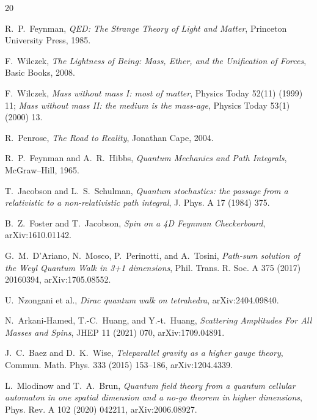 \documentclass[11pt]{article}
\begin{document}
\begin{thebibliography}{20}

R.~P.~Feynman,
\emph{QED: The Strange Theory of Light and Matter},
Princeton University Press, 1985.

F.~Wilczek,
\emph{The Lightness of Being: Mass, Ether, and the Unification of Forces},
Basic Books, 2008.

F.~Wilczek,
\emph{Mass without mass I: most of matter}, Physics Today 52(11) (1999) 11;
\emph{Mass without mass II: the medium is the mass-age},
Physics Today 53(1) (2000) 13.

R.~Penrose,
\emph{The Road to Reality}, Jonathan Cape, 2004.

R.~P.~Feynman and A.~R.~Hibbs,
\emph{Quantum Mechanics and Path Integrals}, McGraw--Hill, 1965.

T.~Jacobson and L.~S.~Schulman,
\emph{Quantum stochastics: the passage from a relativistic to a
non-relativistic path integral}, J. Phys. A 17 (1984) 375.

B.~Z.~Foster and T.~Jacobson,
\emph{Spin on a 4D Feynman Checkerboard}, arXiv:1610.01142.

G.~M.~D'Ariano, N.~Mosco, P.~Perinotti, and A.~Tosini,
\emph{Path-sum solution of the Weyl Quantum Walk in 3+1 dimensions},
Phil. Trans. R. Soc. A 375 (2017) 20160394, arXiv:1705.08552.

U.~Nzongani et al.,
\emph{Dirac quantum walk on tetrahedra}, arXiv:2404.09840.

N.~Arkani-Hamed, T.-C.~Huang, and Y.-t.~Huang,
\emph{Scattering Amplitudes For All Masses and Spins},
JHEP 11 (2021) 070, arXiv:1709.04891.

J.~C.~Baez and D.~K.~Wise,
\emph{Teleparallel gravity as a higher gauge theory},
Commun. Math. Phys. 333 (2015) 153--186, arXiv:1204.4339.

L.~Mlodinow and T.~A.~Brun,
\emph{Quantum field theory from a quantum cellular automaton in one spatial
dimension and a no-go theorem in higher dimensions},
Phys. Rev. A 102 (2020) 042211, arXiv:2006.08927.

\end{thebibliography}
\end{document}
